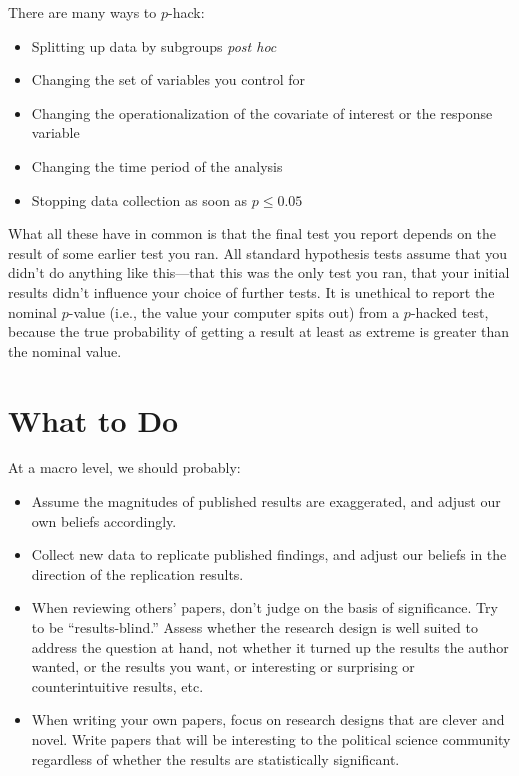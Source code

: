 \documentclass[12pt,oneside,openany]{book}
\providecommand{\tightlist}{%
  \setlength{\itemsep}{0pt}\setlength{\parskip}{0pt}}
\begin{document}
There are many ways to \(p\)-hack:

\begin{itemize}
\tightlist
\item
  Splitting up data by subgroups \emph{post hoc}
\item
  Changing the set of variables you control for
\item
  Changing the operationalization of the covariate of interest or the
  response variable
\item
  Changing the time period of the analysis
\item
  Stopping data collection as soon as \(p \leq 0.05\)
\end{itemize}

What all these have in common is that the final test you report depends
on the result of some earlier test you ran. All standard hypothesis
tests assume that you didn't do anything like this---that this was the
only test you ran, that your initial results didn't influence your
choice of further tests. It is unethical to report the nominal
\(p\)-value (i.e., the value your computer spits out) from a
\(p\)-hacked test, because the true probability of getting a result at
least as extreme is greater than the nominal value.

\section{What to Do}\label{what-to-do}

At a macro level, we should probably:

\begin{itemize}
\item
  Assume the magnitudes of published results are exaggerated, and adjust
  our own beliefs accordingly.
\item
  Collect new data to replicate published findings, and adjust our
  beliefs in the direction of the replication results.
\item
  When reviewing others' papers, don't judge on the basis of
  significance. Try to be ``results-blind.'' Assess whether the research
  design is well suited to address the question at hand, not whether it
  turned up the results the author wanted, or the results you want, or
  interesting or surprising or counterintuitive results, etc.
\item
  When writing your own papers, focus on research designs that are
  clever and novel. Write papers that will be interesting to the
  political science community regardless of whether the results are
  statistically significant.
\end{itemize}
\end{document}
